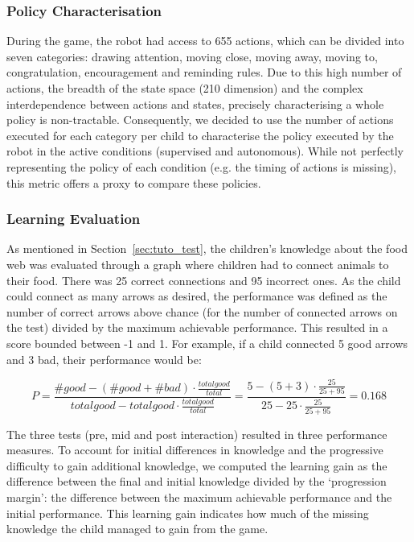 \subsubsection{Policy Characterisation}

During the game, the robot had access to 655 actions, which can be divided into seven categories: drawing attention, moving close, moving away, moving to, congratulation, encouragement and reminding rules. Due to this high number of actions, the breadth of the state space (210 dimension) and the complex interdependence between actions and states, precisely characterising a whole policy is non-tractable. Consequently, we decided to use the number of actions executed for each category per child to characterise the policy executed by the robot in the active conditions (supervised and autonomous). While not perfectly representing the policy of each condition (e.g. the timing of actions is missing), this metric offers a proxy to compare these policies. 

\subsubsection{Learning Evaluation} \label{sec:tuto_perf}

As mentioned in Section~\ref{sec:tuto_test}, the children's knowledge about the food web was evaluated through a graph where children had to connect animals to their food. There was 25 correct connections and 95 incorrect ones. As the child could connect as many arrows as desired, the performance was defined as the number of correct arrows above chance (for the number of connected arrows on the test) divided by the maximum achievable performance. This resulted in a score bounded between -1 and 1. For example, if a child connected 5 good arrows and 3 bad, their performance would be:

\begin{equation}
P=\frac{\#good-(\#good+\#bad) \cdot \frac{total good}{total}}{total good - total good \cdot \frac{total good}{total}} = \frac{5-(5+3) \cdot \frac{25}{25+95}}{25 - 25 \cdot \frac{25}{25+95}}=0.168
\end{equation}
			
The three tests (pre, mid and post interaction) resulted in three performance measures. To account for initial differences in knowledge and the progressive difficulty to gain additional knowledge, we computed the learning gain as the difference between the final and initial knowledge divided by the `progression margin': the difference between the maximum achievable performance and the initial performance. This learning gain indicates how much of the missing knowledge the child managed to gain from the game.
			
